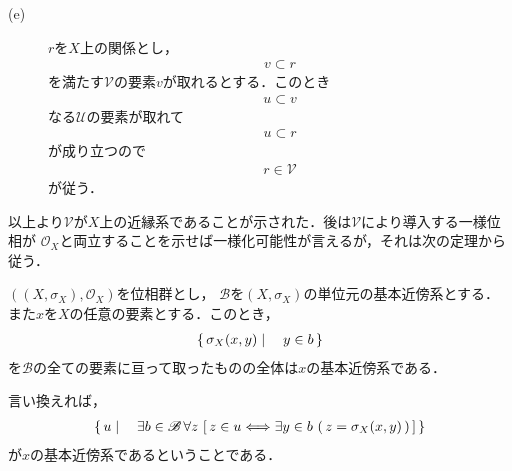 \begin{sketch}
\begin{description}
		\item[(e)] $r$を$X$上の関係とし，
			\begin{align}
				v \subset r
			\end{align}
			を満たす$\mathscr{V}$の要素$v$が取れるとする．このとき
			\begin{align}
				u \subset v
			\end{align}
			なる$\mathscr{U}$の要素が取れて
			\begin{align}
				u \subset r
			\end{align}
			が成り立つので
			\begin{align}
				r \in \mathscr{V}
			\end{align}
			が従う．
			\QED
	\end{description}
	\end{sketch}
	
	以上より$\mathscr{V}$が$X$上の近縁系であることが示された．後は$\mathscr{V}$により導入する一様位相が
	$\mathscr{O}_X$と両立することを示せば一様化可能性が言えるが，それは次の定理から従う．
	
	\begin{screen}
		\begin{thm}[位相群の位相は局所基で決まる]
		\label{thm:topologies_on_topological_groups_are_invariant}
			$\left(\left(X,\sigma_X\right),\mathscr{O}_X\right)$を位相群とし，
			$\mathscr{B}$を$\left(X,\sigma_X\right)$の単位元の基本近傍系とする．また$x$を$X$の任意の要素とする．このとき，
			\begin{align}
				\left\{\, \sigma_X(x,y) \mid \quad y \in b\, \right\}
			\end{align}
			を$\mathscr{B}$の全ての要素に亘って取ったものの全体は$x$の基本近傍系である．
		\end{thm}
	\end{screen}
	
	言い換えれば，
	\begin{align}
		\left\{\, u \mid \quad \exists b \in \mathscr{B}\, 
		\forall z\, \left[\, z \in u \Longleftrightarrow \exists y \in b\, \left(\, z=\sigma_X(x,y)\, \right) \, \right]\, \right\}
	\end{align}
	が$x$の基本近傍系であるということである．
	
